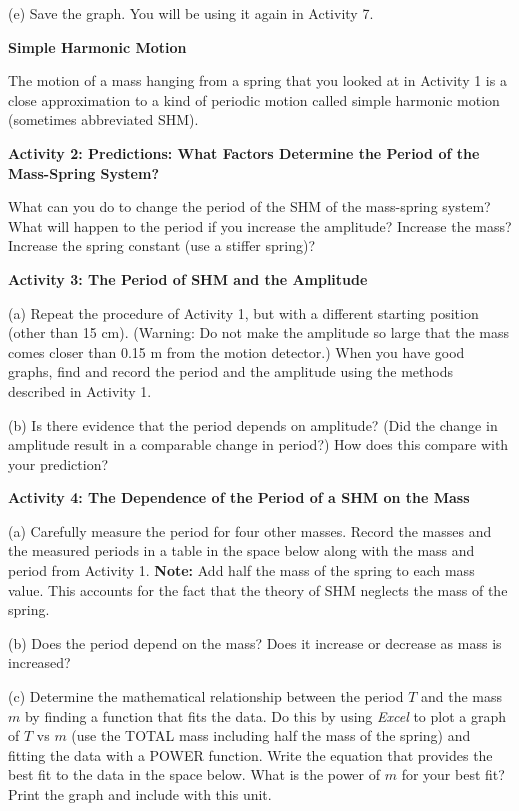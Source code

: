 (e) Save the graph. You will be using it again in Activity 7.

\newpage

\textbf{Simple Harmonic Motion }

The motion of a mass hanging from a spring that you looked at in Activity 1
is a close approximation to a kind of periodic motion called simple harmonic
motion (sometimes abbreviated SHM).

\textbf{Activity 2: Predictions:  What Factors Determine the Period of the Mass-Spring System? }

What can you do to change the period of the SHM of the mass-spring system? What
will happen to the period if you increase the amplitude? Increase the mass?
Increase the spring constant (use a stiffer spring)?
\vspace{30mm}

\textbf{Activity 3: The Period of SHM and the Amplitude} 

(a) Repeat the procedure of Activity 1, but with a different starting position
(other than 15 cm). (Warning: Do not make the amplitude so large that the mass
comes closer than 0.15 m from the motion detector.) When you have good graphs,
find and record the period and the amplitude using the methods described in
Activity 1. 
\vspace{20mm}


(b) Is there evidence that the period depends on amplitude? (Did the change
in amplitude result in a comparable change in period?) How does this
compare with your prediction?
\vspace{30mm}

\textbf{Activity 4: The Dependence of the Period of a SHM on the Mass} 

(a) Carefully measure the period for four other masses. Record the masses and
the measured periods in a table in the space below along with the mass and 
period from Activity 1. \textbf{Note:} Add half the mass of the spring to each
mass value. This accounts for the fact that the theory of SHM neglects the mass 
of the spring.
\vspace{35mm}

(b) Does the period depend on the mass? Does it increase or decrease as mass
is increased?
\vspace{15mm}

(c) Determine the mathematical relationship between the period $T$ and the mass
$m$ by finding a function that fits the data. Do this by using \textit{Excel} to plot 
a graph of $T$ vs $m$ (use the TOTAL mass including half the mass of the 
spring) and fitting the data with a POWER function. Write the equation that 
provides the best fit to the data in the space below. What is the power of 
$m$ for your best fit? Print the graph and include with this unit.
\answerspace{20mm}

